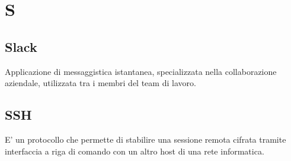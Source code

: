 \section*{S}

\subsection{Slack}
Applicazione di messaggistica istantanea, specializzata nella collaborazione aziendale, utilizzata tra i membri del team di lavoro.

\subsection{SSH}
E' un protocollo che permette di stabilire una sessione remota cifrata tramite interfaccia a riga di comando con un altro host di una rete informatica.
